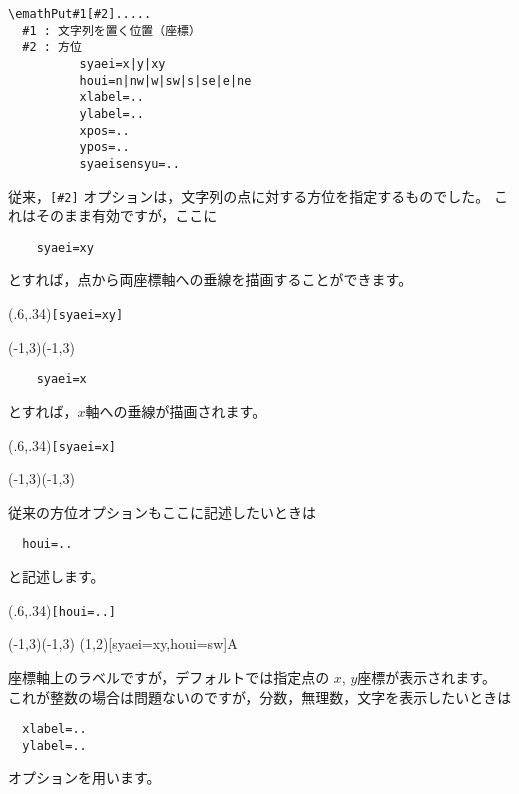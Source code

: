 \begin{boxnote}
\begin{verbatim}
\emathPut#1[#2].....
  #1 : 文字列を置く位置（座標）
  #2 : 方位
          syaei=x|y|xy
          houi=n|nw|w|sw|s|se|e|ne
          xlabel=..
          ylabel=..
          xpos=..
          ypos=..
          syaeisensyu=..
\end{verbatim}
\end{boxnote}

従来，\verb/[#2]/ オプションは，文字列の点に対する方位を指定するものでした。
これはそのまま有効ですが，ここに
\begin{verbatim}
    syaei=xy
\end{verbatim}
とすれば，点から両座標軸への垂線を描画することができます。

\begin{showEx}(.6,.34){\texttt{[syaei=xy]}}
\footnotesize
\begin{zahyou}(-1,3)(-1,3)
  \Put\A[syaei=xy]{}
\end{zahyou}
\end{showEx}

\begin{verbatim}
    syaei=x
\end{verbatim}
とすれば，$x$軸への垂線が描画されます。

\begin{showEx}(.6,.34){\texttt{[syaei=x]}}
\footnotesize
\begin{zahyou}(-1,3)(-1,3)
  \Put\A[syaei=x]{}
\end{zahyou}
\end{showEx}

従来の方位オプションもここに記述したいときは
\begin{verbatim}
  houi=..
\end{verbatim}
と記述します。

\begin{showEx}(.6,.34){\texttt{[houi=..]}}
\footnotesize
\begin{zahyou}(-1,3)(-1,3)
  \def\A{(1,2)}
  \Put\A[syaei=xy,houi=sw]{A}
\end{zahyou}
\end{showEx}


座標軸上のラベルですが，デフォルトでは指定点の $x$, $y$座標が表示されます。
これが整数の場合は問題ないのですが，分数，無理数，文字を表示したいときは
\begin{verbatim}
  xlabel=..
  ylabel=..
\end{verbatim}
オプションを用います。

